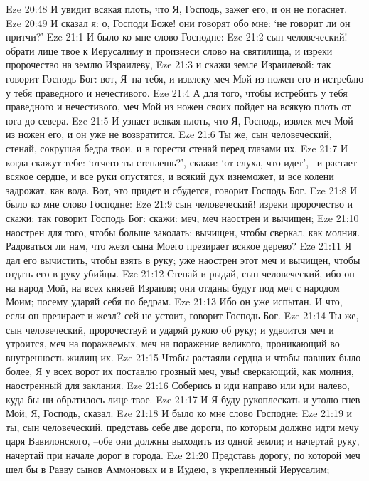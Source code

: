 Eze 20:48  И увидит всякая плоть, что Я, Господь, зажег его, и он не погаснет.
Eze 20:49  И сказал я: о, Господи Боже! они говорят обо мне: `не говорит ли он притчи?'
Eze 21:1  И было ко мне слово Господне:
Eze 21:2  сын человеческий! обрати лице твое к Иерусалиму и произнеси слово на святилища, и изреки пророчество на землю Израилеву,
Eze 21:3  и скажи земле Израилевой: так говорит Господь Бог: вот, Я--на тебя, и извлеку меч Мой из ножен его и истреблю у тебя праведного и нечестивого.
Eze 21:4  А для того, чтобы истребить у тебя праведного и нечестивого, меч Мой из ножен своих пойдет на всякую плоть от юга до севера.
Eze 21:5  И узнает всякая плоть, что Я, Господь, извлек меч Мой из ножен его, и он уже не возвратится.
Eze 21:6  Ты же, сын человеческий, стенай, сокрушая бедра твои, и в горести стенай перед глазами их.
Eze 21:7  И когда скажут тебе: `отчего ты стенаешь?', скажи: `от слуха, что идет', --и растает всякое сердце, и все руки опустятся, и всякий дух изнеможет, и все колени задрожат, как вода. Вот, это придет и сбудется, говорит Господь Бог.
Eze 21:8  И было ко мне слово Господне:
Eze 21:9  сын человеческий! изреки пророчество и скажи: так говорит Господь Бог: скажи: меч, меч наострен и вычищен;
Eze 21:10  наострен для того, чтобы больше заколать; вычищен, чтобы сверкал, как молния. Радоваться ли нам, что жезл сына Моего презирает всякое дерево?
Eze 21:11  Я дал его вычистить, чтобы взять в руку; уже наострен этот меч и вычищен, чтобы отдать его в руку убийцы.
Eze 21:12  Стенай и рыдай, сын человеческий, ибо он--на народ Мой, на всех князей Израиля; они отданы будут под меч с народом Моим; посему ударяй себя по бедрам.
Eze 21:13  Ибо он уже испытан. И что, если он презирает и жезл? сей не устоит, говорит Господь Бог.
Eze 21:14  Ты же, сын человеческий, пророчествуй и ударяй рукою об руку; и удвоится меч и утроится, меч на поражаемых, меч на поражение великого, проникающий во внутренность жилищ их.
Eze 21:15  Чтобы растаяли сердца и чтобы павших было более, Я у всех ворот их поставлю грозный меч, увы! сверкающий, как молния, наостренный для заклания.
Eze 21:16  Соберись и иди направо или иди налево, куда бы ни обратилось лице твое.
Eze 21:17  И Я буду рукоплескать и утолю гнев Мой; Я, Господь, сказал.
Eze 21:18  И было ко мне слово Господне:
Eze 21:19  и ты, сын человеческий, представь себе две дороги, по которым должно идти мечу царя Вавилонского, --обе они должны выходить из одной земли; и начертай руку, начертай при начале дорог в города.
Eze 21:20  Представь дорогу, по которой меч шел бы в Равву сынов Аммоновых и в Иудею, в укрепленный Иерусалим;
